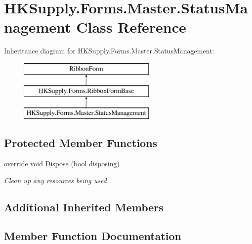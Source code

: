 \hypertarget{class_h_k_supply_1_1_forms_1_1_master_1_1_status_management}{}\section{H\+K\+Supply.\+Forms.\+Master.\+Status\+Management Class Reference}
\label{class_h_k_supply_1_1_forms_1_1_master_1_1_status_management}
Inheritance diagram for H\+K\+Supply.\+Forms.\+Master.\+Status\+Management\+:\begin{figure}[H]
\begin{center}
\leavevmode
\includegraphics[height=3.000000cm]{class_h_k_supply_1_1_forms_1_1_master_1_1_status_management}
\end{center}
\end{figure}
\subsection*{Protected Member Functions}
\begin{DoxyCompactItemize}
\item 
override void \mbox{\hyperlink{class_h_k_supply_1_1_forms_1_1_master_1_1_status_management_ae5ab8bea31355024f1714ca2c6230185}{Dispose}} (bool disposing)
\begin{DoxyCompactList}\small\item\em Clean up any resources being used. \end{DoxyCompactList}\end{DoxyCompactItemize}
\subsection*{Additional Inherited Members}


\subsection{Member Function Documentation}
\mbox{\label{class_h_k_supply_1_1_forms_1_1_master_1_1_status_management_ae5ab8bea31355024f1714ca2c6230185}} 
